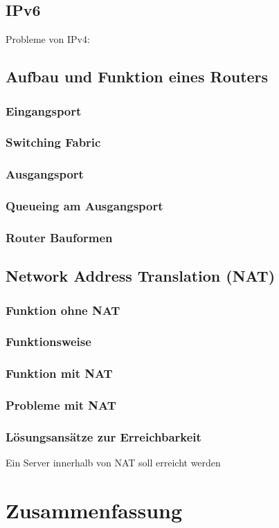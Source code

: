 \subsection{IPv6}
Probleme von IPv4:

\subsection{Aufbau und Funktion eines Routers}
\subsubsection{Eingangsport}
\subsubsection{Switching Fabric}
\subsubsection{Ausgangsport}
\subsubsection{Queueing am Ausgangsport}
\subsubsection{Router Bauformen}

\subsection{Network Address Translation (NAT)}
\subsubsection*{Funktion ohne NAT}
\subsubsection{Funktionsweise}
\subsubsection*{Funktion mit NAT}
\subsubsection{Probleme mit NAT}
\subsubsection{Lösungsansätze zur Erreichbarkeit}
Ein Server innerhalb von NAT soll erreicht werden
\section{Zusammenfassung}

